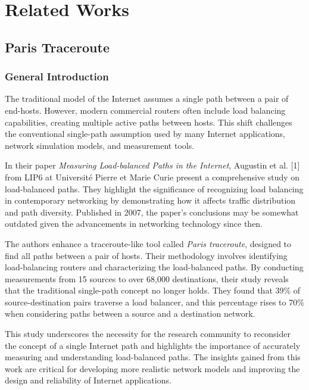 \documentclass[12pt]{cwru_thesis}
\begin{document}







\chapter{Related Works} \label{chap:intro}
\section{Paris Traceroute}

\subsection{General Introduction}
The traditional model of the Internet assumes a single path between a pair of end-hosts. However, modern commercial routers often include load balancing capabilities, creating multiple active paths between hosts. This shift challenges the conventional single-path assumption used by many Internet applications, network simulation models, and measurement tools.

In their paper \textit{Measuring Load-balanced Paths in the Internet}, Augustin et al. [1] from LIP6 at Université Pierre et Marie Curie present a comprehensive study on load-balanced paths. They highlight the significance of recognizing load balancing in contemporary networking by demonstrating how it affects traffic distribution and path diversity. Published in 2007, the paper's conclusions may be somewhat outdated given the advancements in networking technology since then.

The authors enhance a traceroute-like tool called \textit{Paris traceroute}, designed to find all paths between a pair of hosts. Their methodology involves identifying load-balancing routers and characterizing the load-balanced paths. By conducting measurements from 15 sources to over 68,000 destinations, their study reveals that the traditional single-path concept no longer holds. They found that 39\% of source-destination pairs traverse a load balancer, and this percentage rises to 70\% when considering paths between a source and a destination network.

This study underscores the necessity for the research community to reconsider the concept of a single Internet path and highlights the importance of accurately measuring and understanding load-balanced paths. The insights gained from this work are critical for developing more realistic network models and improving the design and reliability of Internet applications.
\end{document}
